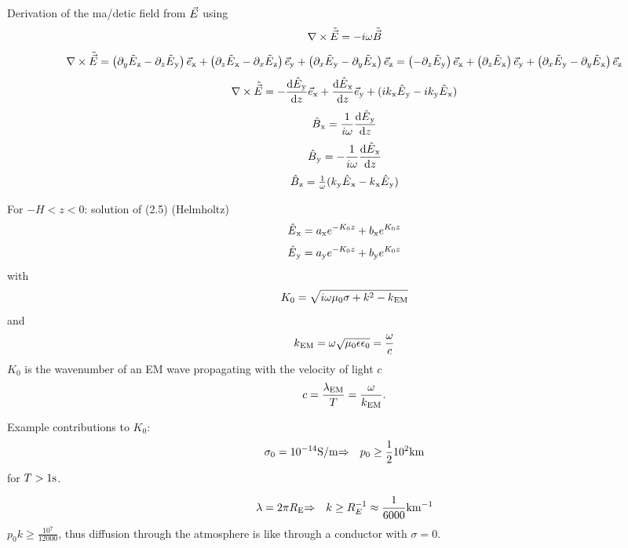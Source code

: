 Derivation of the ma/detic field from \(\vec{E}\) using \[
  \nabla\times\tilde{\vec{E}} = -i\omega\tilde{\vec{B}}
\] \[
  \nabla\times\tilde{\vec{E}}
    = \left( \partial_y\tilde E\text{$_{\mathrm{z}}$} - \partial_z \tilde E\text{$_{\mathrm{y}}$} \right) \vec{e}\text{$_{\mathrm{x}}$}
    + \left( \partial_z\tilde E\text{$_{\mathrm{x}}$} - \partial_x \tilde E\text{$_{\mathrm{z}}$} \right) \vec{e}\text{$_{\mathrm{y}}$}
    + \left( \partial_x\tilde E\text{$_{\mathrm{y}}$} - \partial_y \tilde E\text{$_{\mathrm{x}}$} \right) \vec{e}\text{$_{\mathrm{z}}$}
    = \left( - \partial_z \tilde E\text{$_{\mathrm{y}}$} \right) \vec{e}\text{$_{\mathrm{x}}$}
    + \left( \partial_z\tilde E\text{$_{\mathrm{x}}$}  \right) \vec{e}\text{$_{\mathrm{y}}$}
    + \left( \partial_x\tilde E\text{$_{\mathrm{y}}$} - \partial_y \tilde E\text{$_{\mathrm{x}}$} \right) \vec{e}\text{$_{\mathrm{z}}$}
\] \[
  \nabla\times\hat{\vec{E}}
     = -\frac{\mathrm{d}\hat E\text{$_{\mathrm{y}}$}}{\mathrm{d} z}\vec{e}\text{$_{\mathrm{x}}$}
       + \frac{\mathrm{d}\hat E\text{$_{\mathrm{x}}$}}{\mathrm{d} z}\vec{e}\text{$_{\mathrm{y}}$}
       + (ik\text{$_{\mathrm{x}}$} \hat E\text{$_{\mathrm{y}}$} - ik\text{$_{\mathrm{y}}$}\hat E\text{$_{\mathrm{x}}$})
\] \setcounter{equation}{15}\[
  \hat B\text{$_{\mathrm{x}}$} = \frac{1}{i\omega}\frac{\mathrm{d}\hat E\text{$_{\mathrm{y}}$}}{\mathrm{d} z}
\] \[
  \hat B\text{$_{\mathrm{y}}$} = -\frac{1}{i\omega}\frac{\mathrm{d}\hat E\text{$_{\mathrm{x}}$}}{\mathrm{d} z}
\] \[
  \hat B\text{$_{\mathrm{z}}$} = \tfrac1\omega (k\text{$_{\mathrm{y}}$}\hat E\text{$_{\mathrm{x}}$} - k\text{$_{\mathrm{x}}$}\hat E\text{$_{\mathrm{y}}$})
\]

For \(-H < z < 0\): solution of (2.5) (Helmholtz) \[
  \hat E\text{$_{\mathrm{x}}$} = a\text{$_{\mathrm{x}}$} e^{-K_0 z} + b\text{$_{\mathrm{x}}$} e^{K_0 z}
\] \[
  \hat E\text{$_{\mathrm{y}}$} = a\text{$_{\mathrm{y}}$} e^{-K_0 z} + b\text{$_{\mathrm{y}}$} e^{K_0 z}
\] with \[
  K_0 = \sqrt{i\omega\mu_0\sigma + k^2 - k\text{$_{\mathrm{EM}}$}}
\] and \setcounter{equation}{16}\[
  k\text{$_{\mathrm{EM}}$} = \omega\sqrt{\mu_0\epsilon\epsilon_0} = \frac{\omega}{c}
\] \(K_0\) is the wavenumber of an EM wave propagating with the velocity
of light \(c\) \[
  c = \frac{\lambda\text{$_{\mathrm{EM}}$}}{T} = \frac{\omega}{k\text{$_{\mathrm{EM}}$}}.
\]

Example contributions to \(K_0\): \[
  \sigma_0 = 10^{-14}\mathrm{S/m} {\Rightarrow\quad} p_0 \geq \frac12 10^2\mathrm{km}
\] for \(T>1\mathrm{s}\).

\[
  \lambda = 2\pi R\text{$_{\mathrm{E}}$} {\Rightarrow\quad} k\geq R_E^{-1} \approx \frac1{6000}\mathrm{km^{-1}}
\] \(p_0k \geq \frac{10^7}{12000}\), thus diffusion through the
atmosphere is like through a conductor with \(\sigma = 0\).
